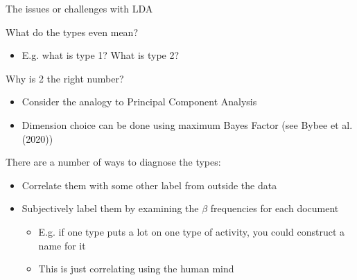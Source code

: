\documentclass[notes,11pt, aspectratio=169]{beamer}
\newenvironment{wideitemize}{\itemize\addtolength{\itemsep}{10pt}}{\enditemize}
\begin{document}
  \begin{frame}{The issues or challenges with LDA}
    \begin{wideitemize}
    \item What do the types even mean?
      \begin{itemize}
      \item E.g. what is type 1? What is type 2?
      \end{itemize}
    \item Why is 2 the right number?
      \begin{itemize}
      \item Consider the analogy to Principal Component Analysis
      \item Dimension choice can be done using maximum Bayes Factor
        (see Bybee et al. (2020))
      \end{itemize}
    \item There are a number of ways to diagnose the types:
      \begin{itemize}
      \item Correlate them with some other label from outside the data
      \item Subjectively label them by examining the $\beta$ frequencies for each document
        \begin{itemize}
        \item E.g. if one type puts a lot on one type of activity, you could construct a name for it
        \item This is just correlating using the human mind
        \end{itemize}
      \end{itemize}
    \end{wideitemize}
  \end{frame}
\end{document}
